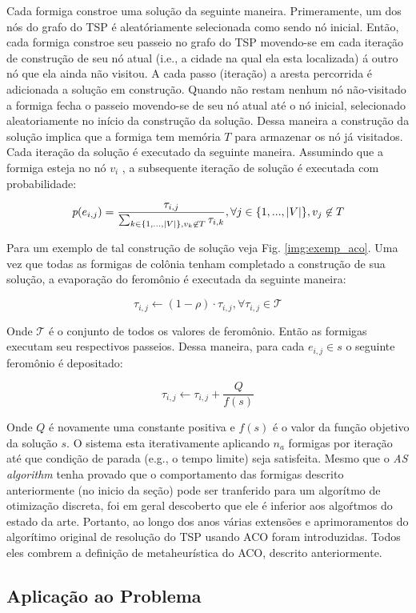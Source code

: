 Cada formiga constroe uma solução da seguinte maneira.
Primeramente, um dos nós do grafo do TSP é aleatóriamente selecionada como sendo nó inicial.
Então, cada formiga constroe seu passeio no grafo do TSP movendo-se em cada iteração de construção
de seu nó atual (i.e., a cidade na qual ela esta localizada) á outro nó que ela ainda não visitou.
A cada passo (iteração) a aresta percorrida é adicionada a solução em construção. Quando não 
restam nenhum nó não-visitado a formiga fecha o passeio movendo-se de seu nó atual até
o nó inicial, selecionado aleatoriamente no início da construção da solução. Dessa maneira a 
construção da solução implica que a formiga tem memória $T$ para armazenar os nó já
visitados. Cada iteração da solução é executado da seguinte maneira. 
Assumindo que a formiga esteja no nó $v_i$ , a subsequente iteração de solução é executada com probabilidade:

\begin{equation}
  \emph{p}(e_{i,j}) = \frac{\tau_{i,j}}{\sum_{k \in \lbrace 1,...,
  \vert V \vert\rbrace, v_k \not\in T}\tau_{i,k}},
  \forall j \in \lbrace 1,...,\vert V \vert\rbrace, v_j \not\in T
\end{equation}

Para um exemplo de tal construção de solução  veja Fig. \ref{img:exemp_aco}.
Uma vez que todas as formigas de colônia tenham completado a construção de sua
solução, a evaporação do feromônio é executada da seguinte maneira:

\begin{equation}
  \tau_{i,j} \leftarrow (1-\rho)\cdot \tau_{i,j}, \forall \tau_{i,j}\in \mathcal{T}
\end{equation}

Onde $\mathcal{T }$ é o conjunto de todos os valores de feromônio.
Então as formigas executam seu respectivos passeios. Dessa maneira,
para cada $e_{i,j} \in s$ o seguinte feromônio é depositado:

\begin{equation}
  \tau_{i,j} \leftarrow \tau_{i,j} + \frac{Q}{f(s)}
\end{equation}

Onde $Q$ é novamente uma constante positiva e $f(s)$ é o valor da função objetivo
da solução $s$. O sistema esta iterativamente aplicando $n_a$ 
formigas por iteração até que condição de parada
(e.g., o tempo limite) seja satisfeita.
Mesmo que o \textit{AS algorithm} tenha provado que o comportamento das formigas
descrito anteriormente (no inicio da seção) pode ser tranferido para um algorítmo 
de otimização discreta, foi
em geral descoberto que ele é inferior aos algoŕtmos do estado da arte.
Portanto, ao longo dos anos várias extensões e aprimoramentos do algorítimo
original de resolução do TSP usando ACO foram introduzidas. Todos eles combrem a definição de metaheurística do ACO,
descrito anteriormente.
 
\subsection{Aplicação ao Problema}
